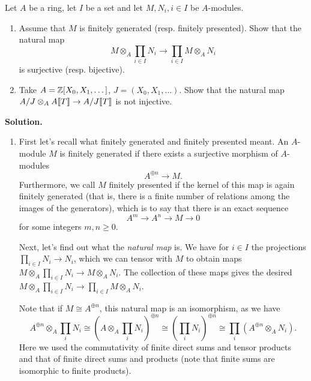 \documentclass[a4paper,11pt]{article}
\begin{document}
Let $A$ be a ring, let $I$ be a set and let $M, N_i, i \in I$ be $A$-modules. 
\begin{enumerate}
    \item Assume that $M$ is finitely generated (resp. finitely presented). Show that the natural map 
        \begin{equation*}
        M \otimes_A \prod_{i \in I} N_i \to \prod_{i \in I} M \otimes_A N_i
        \end{equation*}
        is surjective (resp. bijective). 
    \item Take $A = \mathbb{Z}[X_0, X_1,  \dots]$, $J = (X_0, X_1, \dots)$. Show that the
        natural map $A/J \otimes_A A\llbracket T \rrbracket \to A/J\llbracket T\rrbracket$ is not
        injective.
\end{enumerate}
\textbf{Solution.}
\begin{enumerate}
    \item First let's recall what finitely generated and finitely presented meant.
        An $A$-module $M$ is finitely generated if there exists a surjective 
        morphism of $A$-modules
        \begin{equation*}
            A^{\oplus n} \to M.
        \end{equation*}
        Furthermore, we call $M$ finitely presented if the kernel of this map is
        again finitely generated (that is, there is a finite number of relations
        among the images of the generators), which is to say that there is an 
        exact sequence
        \begin{equation*}
            A^m \to A^n \to M \to 0
        \end{equation*}
        for some integers $m,n \geq 0$. 

        Next, let's find out what the \textit{natural map} is. We have for $i
        \in I$ the projections $\prod_{i \in I} N_i \to N_i$, which we can
        tensor with $M$ to obtain maps $M \otimes_A \prod_{i \in I} N_i 
        \to M \otimes_A N_i$. The collection of these maps gives the desired
        $M \otimes_A \prod_{i \in I} N_i \to \prod_{i \in I} M \otimes_A N_i$. 

        Note that if $M \cong A^{\oplus n}$, this natural map is an isomorphism,
        as we have
        \begin{equation*}
            A^{\oplus n} \otimes_A \prod_i N_i \cong (A \otimes_A \prod_i
            N_i)^{\oplus n} \cong (\prod_i N_i)^{\oplus n} \cong \prod_i
            (A^{\oplus n} \otimes_A N_i).
        \end{equation*}
        Here we used the commutativity of finite direct sums and tensor products and 
        that of finite direct sums and products (note that finite sums are isomorphic
        to finite products).


\end{enumerate}
\end{document}
